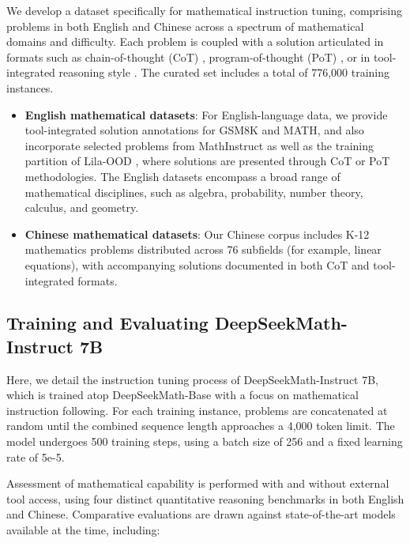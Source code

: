 We develop a dataset specifically for mathematical instruction tuning, comprising problems in both English and Chinese across a spectrum of mathematical domains and difficulty. Each problem is coupled with a solution articulated in formats such as chain-of-thought (CoT) \citep{cot}, program-of-thought (PoT) \citep{pot,pal}, or in tool-integrated reasoning style \citep{tora}. The curated set includes a total of 776,000 training instances.

\begin{itemize}[topsep=0pt]
    \item \textbf{English mathematical datasets}: For English-language data, we provide tool-integrated solution annotations for GSM8K and MATH, and also incorporate selected problems from MathInstruct \citep{MathInstruct} as well as the training partition of Lila-OOD \citep{lila}, where solutions are presented through CoT or PoT methodologies. The English datasets encompass a broad range of mathematical disciplines, such as algebra, probability, number theory, calculus, and geometry.
    \item \textbf{Chinese mathematical datasets}: Our Chinese corpus includes K-12 mathematics problems distributed across 76 subfields (for example, linear equations), with accompanying solutions documented in both CoT and tool-integrated formats.
\end{itemize}

\subsection{Training and Evaluating DeepSeekMath-Instruct 7B}

Here, we detail the instruction tuning process of DeepSeekMath-Instruct 7B, which is trained atop DeepSeekMath-Base with a focus on mathematical instruction following. For each training instance, problems are concatenated at random until the combined sequence length approaches a 4,000 token limit. The model undergoes 500 training steps, using a batch size of 256 and a fixed learning rate of 5e-5.

Assessment of mathematical capability is performed with and without external tool access, using four distinct quantitative reasoning benchmarks in both English and Chinese. Comparative evaluations are drawn against state-of-the-art models available at the time, including:

